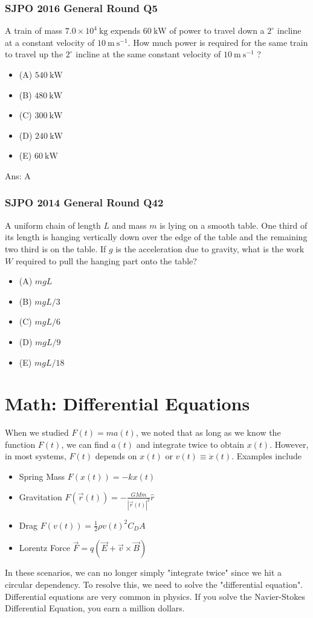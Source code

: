 \documentclass{article}
\begin{document}
\subsubsection{SJPO 2016 General Round Q5}
A train of mass $7.0 \times 10^4 \mathrm{~kg}$ expends $60 \mathrm{~kW}$ of power to travel down a $2^{\circ}$ incline at a constant velocity of $10 \mathrm{~m} \mathrm{~s}^{-1}$. How much power is required for the same train to travel up the $2^{\circ}$ incline at the same constant velocity of $10 \mathrm{~m} \mathrm{~s}^{-1}$ ?
\begin{itemize}
\item[] (A) $540 \mathrm{~kW}$
\item[] (B) $480 \mathrm{~kW}$
\item[] (C) $300 \mathrm{~kW}$
\item[] (D) $240 \mathrm{~kW}$
\item[] (E) $60 \mathrm{~kW}$
\end{itemize}
Ans:  \ifpaper A \fi

\subsubsection{SJPO 2014 General Round Q42}
A uniform chain of length $L$ and mass $m$ is lying on a smooth table. One third of its length is hanging vertically down over the edge of the table and the remaining two third is on the table. If $g$ is the acceleration due to gravity, what is the work $W$ required to pull the hanging part onto the table?
\begin{itemize}
\item[] (A) $m g L$
\item[] (B) $m g L / 3$
\item[] (C) $m g L / 6$
\item[] (D) $m g L / 9$
\item[] (E) $m g L / 18$
\end{itemize}
\newpage \clearpage
\section{Math: Differential Equations}
When we studied $F(t)=ma(t)$, we noted that as long as we know the function $F(t)$, we can find $a(t)$ and integrate twice to obtain $x(t)$. However, in most systems, $F(t)$ depends on $x(t)$ or $v(t) \equiv \dot{x}(t)$. Examples include 
\begin{itemize}
    \item Spring Mass $F(x(t)) = -kx(t)$
    \item Gravitation $F(\vec{r}(t)) = -\frac{GMm}{|\vec{r}(t)|^2} \hat{r}$
    \item Drag $F(v(t)) = \frac{1}{2} \rho v(t)^2 C_D A$
    \item Lorentz Force $\vec{F} = q(\vec{E} + \vec{v} \times \vec{B})$
\end{itemize}
In these scenarios, we can no longer simply "integrate twice" since we hit a circular dependency. To resolve this, we need to solve the "differential equation". Differential equations are very common in physics. If you solve the Navier-Stokes Differential Equation, you earn a million dollars.
\end{document}
